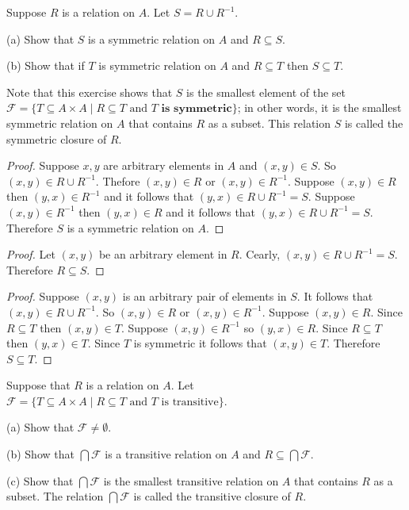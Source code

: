 \begin{tcolorbox}[title=Problem 24, breakable]
    Suppose $R$ is a relation on $A$. Let $S = R \cup R^{-1}$.

    (a) Show that $S$ is a symmetric relation on $A$ and $R \subseteq S$.

    (b) Show that if $T$ is symmetric relation on $A$ and $R \subseteq T$
        then $S \subseteq T$.

    Note that this exercise shows that $S$ is the smallest element of the set 
    $\mathcal{F} = \{T \subseteq A \times A \mid R \subseteq T \text{ and } T \textbf{ is symmetric}\}$;
    in other words, it is the smallest symmetric relation on $A$ that contains $R$ as a subset. This 
    relation $S$ is called the symmetric closure of $R$.
\end{tcolorbox}

\begin{proof}
    Suppose $x, y$ are arbitrary elements in $A$ and $(x, y) \in S$.
    So $(x, y) \in R \cup R^{-1}$.
    Thefore $(x, y) \in R$ or $(x, y) \in R^{-1}$.
    Suppose $(x, y) \in R$ then $(y, x) \in R^{-1}$
        and it follows that $(y, x) \in R \cup R^{-1} = S$.
    Suppose $(x, y) \in R^{-1}$ then $(y, x) \in R$
        and it follows that $(y, x) \in R \cup R^{-1} = S$.
    Therefore $S$ is a symmetric relation on $A$.
\end{proof}

\begin{proof}
    Let $(x, y)$ be an arbitrary element in $R$.
    Cearly, $(x, y) \in R \cup R^{-1} = S$.
    Therefore $R \subseteq S$.
\end{proof}

\begin{proof}
    Suppose $(x, y)$ is an arbitrary pair of elements in $S$.
    It follows that $(x, y) \in R \cup R^{-1}$.
    So $(x, y) \in R$ or $(x, y) \in R^{-1}$.
    Suppose $(x, y) \in R$.
    Since $R \subseteq T$ then $(x, y) \in T$.
    Suppose $(x, y) \in R^{-1}$ so $(y, x) \in R$.
    Since $R \subseteq T$ then $(y, x) \in T$.
    Since $T$ is symmetric it follows that $(x, y) \in T$.
    Therefore $S \subseteq T$.
\end{proof}

\newpage
\begin{tcolorbox}[title=Problem 25, breakable]
    Suppose that $R$ is a relation on $A$. Let $\mathcal{F} = \{T \subseteq A \times A \mid R \subseteq T
    \text{ and } T \text{ is transitive}\}$.

    (a) Show that $\mathcal{F} \not = \emptyset$.

    (b) Show that $\bigcap \mathcal{F}$ is a transitive relation on $A$ and $R \subseteq \bigcap \mathcal{F}$.
    
    (c) Show that $\bigcap \mathcal{F}$ is the smallest transitive relation on $A$ that contains $R$ 
        as a subset. The relation $\bigcap \mathcal{F}$ is called the transitive closure of $R$.
\end{tcolorbox}


